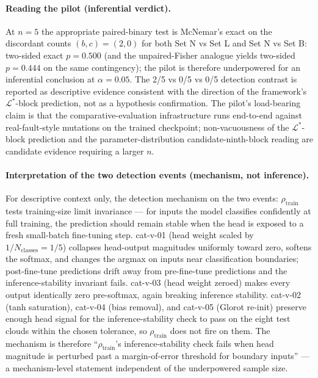 \documentclass[acmsmall, screen]{acmart}
\begin{document}
\paragraph{Reading the pilot (inferential verdict).}
At $n=5$ the appropriate paired-binary test is McNemar's exact on the discordant counts $(b, c) = (2, 0)$ for both Set N vs Set L and Set N vs Set B: two-sided exact $p = 0.500$ (and the unpaired-Fisher analogue yields two-sided $p = 0.444$ on the same contingency); the pilot is therefore underpowered for an inferential conclusion at $\alpha = 0.05$. The 2/5 vs 0/5 vs 0/5 detection contrast is reported as descriptive evidence consistent with the direction of the framework's $\mathcal{L}^{*}$-block prediction, not as a hypothesis confirmation. The pilot's load-bearing claim is that the comparative-evaluation infrastructure runs end-to-end against real-fault-style mutations on the trained checkpoint; non-vacuousness of the $\mathcal{L}^{*}$-block prediction and the parameter-distribution candidate-ninth-block reading are candidate evidence requiring a larger $n$.

\paragraph{Interpretation of the two detection events (mechanism, not inference).}
For descriptive context only, the detection mechanism on the two events: $\rho_{\mathrm{train}}$ tests training-size limit invariance --- for inputs the model classifies confidently at full training, the prediction should remain stable when the head is exposed to a fresh small-batch fine-tuning step. cat-v-01 (head weight scaled by $1/N_{\mathrm{classes}}=1/5$) collapses head-output magnitudes uniformly toward zero, softens the softmax, and changes the argmax on inputs near classification boundaries; post-fine-tune predictions drift away from pre-fine-tune predictions and the inference-stability invariant fails. cat-v-03 (head weight zeroed) makes every output identically zero pre-softmax, again breaking inference stability. cat-v-02 (tanh saturation), cat-v-04 (bias removal), and cat-v-05 (Glorot re-init) preserve enough head signal for the inference-stability check to pass on the eight test clouds within the chosen tolerance, so $\rho_{\mathrm{train}}$ does not fire on them. The mechanism is therefore ``$\rho_{\mathrm{train}}$'s inference-stability check fails when head magnitude is perturbed past a margin-of-error threshold for boundary inputs'' --- a mechanism-level statement independent of the underpowered sample size.
\end{document}
